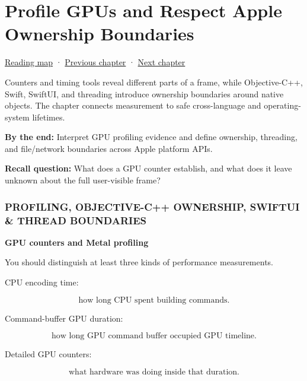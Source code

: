\chapter{Profile GPUs and Respect Apple Ownership Boundaries}\label{01-foundations-i-ch016-profile-gpus-and-respect-apple-ownership-boundaries}\hypertarget{01-foundations-i-ch016}{}\label{stagechapter:01-foundations-i-ch016}

\hypertarget{01-foundations-i-ch016-profile-gpus-and-respect-apple-ownership-boundaries}{}

\hyperref[volume-reading-map]{Reading map} · \hyperref[01-foundations-i-ch015-execute-and-measure-a-metal-frame]{Previous chapter} · \hyperref[03-visual-computing-i-ch006]{Next chapter}

Counters and timing tools reveal different parts of a frame, while Objective-C++, Swift, SwiftUI, and threading introduce ownership boundaries around native objects. The chapter connects measurement to safe cross-language and operating-system lifetimes.

\textbf{By the end:} Interpret GPU profiling evidence and define ownership, threading, and file/network boundaries across Apple platform APIs.

\textbf{Recall question:} What does a GPU counter establish, and what does it leave unknown about the full user-visible frame?

\subsection{PROFILING, OBJECTIVE-C++ OWNERSHIP, SWIFTUI \& THREAD BOUNDARIES}\label{01-foundations-i-ch016-profiling-objective-c-ownership-swiftui-thread-boundaries}

\hypertarget{01-foundations-i-ch016-profiling-objective-c-ownership-swiftui-thread-boundaries}{}

\textbf{GPU counters and Metal profiling}

You should distinguish at least three kinds of performance measurements.

CPU encoding time:

\[
\text{how long CPU spent building commands}.
\]

Command-buffer GPU duration:

\[
\text{how long GPU command buffer occupied GPU timeline}.
\]

Detailed GPU counters:

\[
\text{what hardware was doing inside that duration}.
\]

